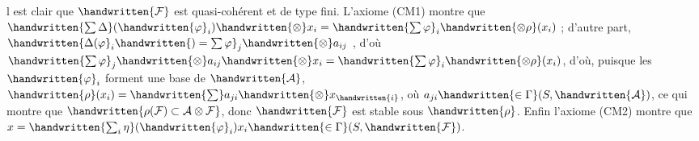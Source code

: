  l est clair que $\handwritten{\mathcal{F}}$ est quasi-cohérent et de type fini. L'axiome (CM1) montre que $\handwritten{\sum\Delta}(\handwritten{\varphi}_i)\handwritten{\otimes}x_i=\handwritten{\sum\varphi}_i\handwritten{\otimes\rho}(x_i)$ ; d'autre part, $\handwritten{\Delta(\varphi}_i\handwritten{)=\sum\varphi}_j\handwritten{\otimes}a_{ij}$ , d'où $\handwritten{\sum\varphi}_j\handwritten{\otimes}a_{ij}\handwritten{\otimes}x_i=\handwritten{\sum\varphi}_i\handwritten{\otimes\rho}(x_i)$, d'où, puisque les $\handwritten{\varphi}_i$ forment une base de $\handwritten{\mathcal{A}}$, $\handwritten{\rho}(x_i)=\handwritten{\sum}a_{ji}\handwritten{\otimes}x_{\handwritten{i}}$, où $a_{ji}\handwritten{\in\Gamma}(S,\handwritten{\mathcal{A}})$, ce qui montre que $\handwritten{\rho(\mathcal{F})\subset\mathcal{A}\otimes\mathcal{F}}$, donc $\handwritten{\mathcal{F}}$ est stable sous $\handwritten{\rho}$. Enfin l'axiome (CM2) montre que $x=\handwritten{\sum_i\eta}(\handwritten{\varphi}_i)x_i\handwritten{\in\Gamma}(S,\handwritten{\mathcal{F}})$.

